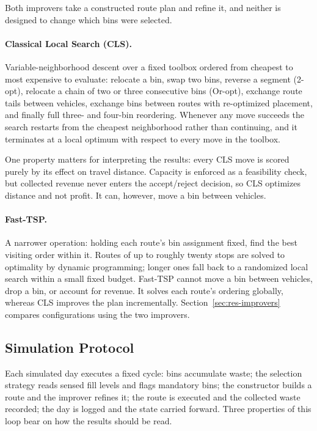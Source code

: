 \documentclass[orivec,runningheads]{llncs}
\begin{document}
Both improvers take a constructed route plan and refine it, and neither is
designed to change which bins were selected.

\paragraph{Classical Local Search (CLS).}
Variable-neighborhood descent over a fixed toolbox ordered from cheapest to
most expensive to evaluate: relocate a bin, swap two bins, reverse a segment
(2-opt), relocate a chain of two or three consecutive bins (Or-opt), exchange
route tails between vehicles, exchange bins between routes with re-optimized
placement, and finally full three- and four-bin reordering. Whenever any move
succeeds the search restarts from the cheapest neighborhood rather than
continuing, and it terminates at a local optimum with respect to every move in
the toolbox.

One property matters for interpreting the results: every CLS move is scored
purely by its effect on travel distance. Capacity is enforced as a feasibility
check, but collected revenue never enters the accept/reject decision, so CLS
optimizes distance and not profit. It can, however, move a bin between vehicles.

\paragraph{Fast-TSP.}
A narrower operation: holding each route's bin assignment fixed, find the best
visiting order within it. Routes of up to roughly twenty stops are solved to
optimality by dynamic programming; longer ones fall back to a randomized local
search within a small fixed budget. Fast-TSP cannot move a bin between vehicles,
drop a bin, or account for revenue. It solves each route's ordering globally,
whereas CLS improves the plan incrementally. Section~\ref{sec:res-improvers}
compares configurations using the two improvers.

\subsection{Simulation Protocol}
\label{sec:protocol}

Each simulated day executes a fixed cycle: bins accumulate waste; the selection strategy reads sensed fill levels and flags mandatory bins; the constructor builds a route and the improver refines it; the route is executed and the collected waste recorded; the day is logged and the state carried forward. Three properties of this loop bear on how the results should be read.
\end{document}

